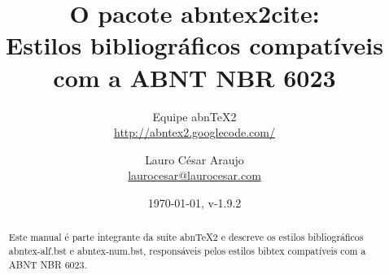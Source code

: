 \documentclass[a4paper]{ltxdoc}
\begin{document}
\nocite{tourinho1994,silva1996,rego1991,marques1993,tamandare1993}
\nocite{cesar1994,azevedo1994,batista1992,chueire1994}
\nocite{duran1993,chemello1993}
\nocite{arbex1993,carvalho1994,miglori1993,amaral1994,rodrigues1994}
\nocite{carruth1993,saadi1994,mandino1994}
\nocite{makau1962,lion1981}
\nocite{morgado1990,araujo1986}
\nocite{morgadob1990}
\nocite{morgadoc1990}
\nocite{laurenti1978,marins1991,malagrino1985,zilberman1998,holanda1994,pelosi1993,tringali1994,delosmar1997,resprinb1997,cardim1984}
\nocite{cretella1992,boletime1965}
\nocite{freyre1943,freyre1936}
\nocite{freyreg1936,freyre1938}
\nocite{DOI}
\nocite{hamada2008}

\nocite{ABNT-final}

\newcommand{\titulo}{\textbf{O pacote \textsf{abntex2cite}}:\\
\Large{Estilos bibliográficos compatíveis com a ABNT NBR 6023}}
\newcommand{\abnTeX}{abn\TeX}
\newcommand{\abnTeXSite}{\url{http://abntex2.googlecode.com/}}
\newcommand{\optiondefaultval}[1]{\underline{\texttt{#1}}}

\title{\titulo}
\author{Equipe \abnTeX2\\\abnTeXSite 
\and 
Lauro César Araujo\\\url{laurocesar@laurocesar.com}}
\date{\today, v-1.9.2}


% 

\maketitle

\begin{abstract}
Este manual é parte integrante da suíte \abnTeX2 e descreve os estilos
bibliográficos \textsf{abntex-alf.bst} e \textsf{abntex-num.bst}, responsáveis
pelos estilos \textsf{bibtex} compatíveis com a ABNT NBR 6023.
\end{abstract}
\end{document}
